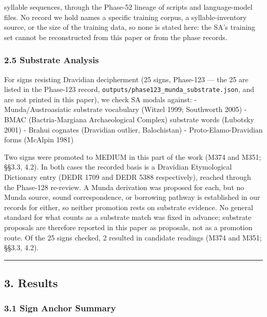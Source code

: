 \documentclass[
]{article}
\newcounter{none} %
\begin{document}
syllable sequences, through the Phase-52 lineage of scripts and language-model files. No record we hold names a specific training corpus, a syllable-inventory source, or the size of the training data, so none is stated here: the SA's training set cannot be reconstructed from this paper or from the phase records.

\subsubsection{2.5 Substrate Analysis}\label{substrate-analysis}

For signs resisting Dravidian decipherment (25 signs, Phase-123 --- the 25 are listed in the Phase-123 record, \texttt{outputs/phase123\_munda\_substrate.json}, and are not printed in this paper), we check SA modals against: - Munda/Austroasiatic substrate vocabulary
(Witzel 1999; Southworth 2005) - BMAC (Bactria-Margiana Archaeological
Complex) substrate words (Lubotsky 2001) - Brahui cognates (Dravidian
outlier, Balochistan) - Proto-Elamo-Dravidian forms (McAlpin 1981)

Two signs were promoted to MEDIUM in this part of the work (M374 and M351; §§3.3, 4.2). In both cases the recorded basis is a Dravidian Etymological Dictionary entry (DEDR 1709 and DEDR 5388 respectively), reached through the Phase-128 re-review. A Munda derivation was proposed for each, but no Munda source, sound correspondence, or borrowing pathway is established in our records for either, so neither promotion rests on substrate evidence. No general standard for what counts as a substrate match was fixed in advance; substrate proposals are therefore reported in this paper as proposals, not as a promotion route. Of the 25 signs checked, 2 resulted in candidate readings (M374 and M351; §§3.3, 4.2).

\begin{center}\rule{0.5\linewidth}{0.5pt}\end{center}

\subsection{3. Results}\label{results}

\subsubsection{3.1 Sign Anchor Summary}\label{sign-anchor-summary}
\end{document}
